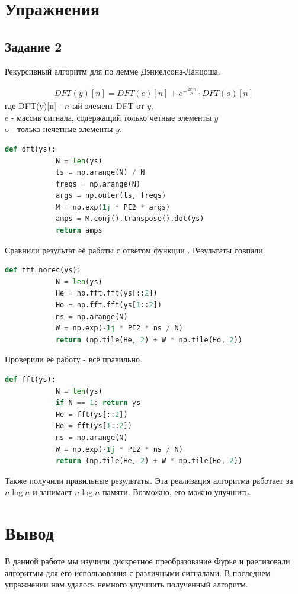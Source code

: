 \documentclass[a4paper, 12pt]{report}
\begin{document}
	\chapter{Упражнения}
	\section{Задание 2}
	Рекурсивный алгоритм для  по лемме Дэниелсона-Ланцоша.

	\begin{align}
        		DFT(y)[n] = DFT(e)[n] + e^{-\frac{2\pi in}{N}}\cdot DFT(o)[n]
    	\end{align}
	где DFT(y)[n] - $n$-ый элемент DFT от $y$, \\
		e - массив сигнала, содержащий только четные элементы $y$ \\
		o - только нечетные элементы $y$.
	\begin{lstlisting}[language=Python,caption=Функция DFT]
		def dft(ys):
			N = len(ys)
			ts = np.arange(N) / N
			freqs = np.arange(N)
			args = np.outer(ts, freqs)
			M = np.exp(1j * PI2 * args)
			amps = M.conj().transpose().dot(ys)
			return amps
	\end{lstlisting}
	Сравнили результат её работы с ответом функции . Результаты совпали.
	\begin{lstlisting}[language=Python,caption=Функция для разделения исходного массива пополам]
		def fft_norec(ys):
			N = len(ys)
			He = np.fft.fft(ys[::2])
			Ho = np.fft.fft(ys[1::2])
			ns = np.arange(N)
			W = np.exp(-1j * PI2 * ns / N)
			return (np.tile(He, 2) + W * np.tile(Ho, 2))
	\end{lstlisting}
	Проверили её работу - всё правильно.
	\begin{lstlisting}[language=Python,caption=Итоговая функция]
		def fft(ys):
			N = len(ys)
			if N == 1: return ys    
			He = fft(ys[::2])
			Ho = fft(ys[1::2])
			ns = np.arange(N)
			W = np.exp(-1j * PI2 * ns / N)
			return (np.tile(He, 2) + W * np.tile(Ho, 2))
	\end{lstlisting}
	Также получили правильные результаты. Эта реализация алгоритма работает за $n \log n$ и занимает $n \log n$ памяти. Возможно, его можно улучшить.

	\chapter{Вывод}
	В данной работе мы изучили дискретное преобразование Фурье и раелизовали алгоритмы для его использования с различными сигналами. В последнем упражнении нам удалось немного улучшить полученный алгоритм.
\end{document}
